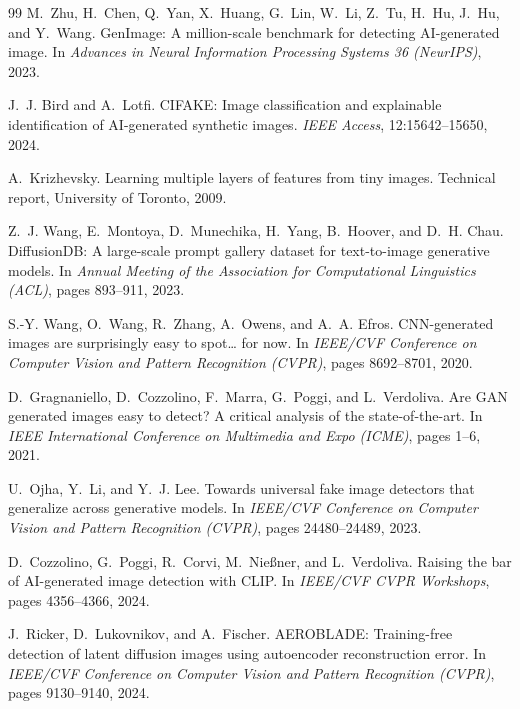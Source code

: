 \documentclass[12pt,a4paper]{book}
\theoremstyle{definition}
\theoremstyle{remark}
\begin{document}
\begin{thebibliography}{99}
M.~Zhu, H.~Chen, Q.~Yan, X.~Huang, G.~Lin, W.~Li, Z.~Tu, H.~Hu, J.~Hu, and Y.~Wang.
\newblock GenImage: A million-scale benchmark for detecting AI-generated image.
\newblock In \emph{Advances in Neural Information Processing Systems 36 (NeurIPS)}, 2023.

J.~J. Bird and A.~Lotfi.
\newblock CIFAKE: Image classification and explainable identification of AI-generated synthetic images.
\newblock \emph{IEEE Access}, 12:15642--15650, 2024.

A.~Krizhevsky.
\newblock Learning multiple layers of features from tiny images.
\newblock Technical report, University of Toronto, 2009.

Z.~J. Wang, E.~Montoya, D.~Munechika, H.~Yang, B.~Hoover, and D.~H. Chau.
\newblock DiffusionDB: A large-scale prompt gallery dataset for text-to-image generative models.
\newblock In \emph{Annual Meeting of the Association for Computational Linguistics (ACL)}, pages 893--911, 2023.

S.-Y. Wang, O.~Wang, R.~Zhang, A.~Owens, and A.~A. Efros.
\newblock CNN-generated images are surprisingly easy to spot\ldots{} for now.
\newblock In \emph{IEEE/CVF Conference on Computer Vision and Pattern Recognition (CVPR)}, pages 8692--8701, 2020.

D.~Gragnaniello, D.~Cozzolino, F.~Marra, G.~Poggi, and L.~Verdoliva.
\newblock Are GAN generated images easy to detect? A critical analysis of the state-of-the-art.
\newblock In \emph{IEEE International Conference on Multimedia and Expo (ICME)}, pages 1--6, 2021.

U.~Ojha, Y.~Li, and Y.~J. Lee.
\newblock Towards universal fake image detectors that generalize across generative models.
\newblock In \emph{IEEE/CVF Conference on Computer Vision and Pattern Recognition (CVPR)}, pages 24480--24489, 2023.

D.~Cozzolino, G.~Poggi, R.~Corvi, M.~Nie{\ss}ner, and L.~Verdoliva.
\newblock Raising the bar of AI-generated image detection with CLIP.
\newblock In \emph{IEEE/CVF CVPR Workshops}, pages 4356--4366, 2024.

J.~Ricker, D.~Lukovnikov, and A.~Fischer.
\newblock AEROBLADE: Training-free detection of latent diffusion images using autoencoder reconstruction error.
\newblock In \emph{IEEE/CVF Conference on Computer Vision and Pattern Recognition (CVPR)}, pages 9130--9140, 2024.


\end{thebibliography}
\end{document}

